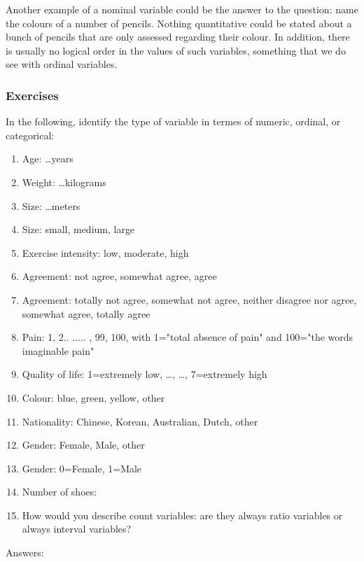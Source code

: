 \documentclass[]{report}\usepackage[]{graphicx}\usepackage[]{color}
\begin{document}
Another example of a nominal variable could be the answer to the question: name the colours of a number of pencils. Nothing quantitative could be stated about a bunch of pencils that are only assessed regarding their colour. In addition, there is usually no logical order in the values of such variables, something that we do see with ordinal variables.

\subsubsection{Exercises}
In the following, identify the type of variable in termes of numeric, ordinal, or categorical:
\begin{enumerate}
\item Age: \dots years
\item Weight: \dots kilograms
\item Size: \dots meters
\item Size: small, medium, large
\item Exercise intensity: low, moderate, high
\item Agreement: not agree, somewhat agree, agree
\item Agreement: totally not agree, somewhat not agree, neither disagree nor agree, somewhat agree, totally agree
\item Pain: 1, 2.. ..... , 99, 100, with 1="total absence of pain" and 100="the words imaginable pain"
\item Quality of life: 1=extremely low, \dots, \dots, 7=extremely high
\item Colour: blue, green, yellow, other
\item Nationality: Chinese, Korean, Australian, Dutch, other
\item Gender: Female, Male, other
\item Gender: 0=Female, 1=Male
\item Number of shoes:
\item How would you describe count variables: are they always ratio variables or always interval variables?
\end{enumerate}

Answers:
\end{document}
